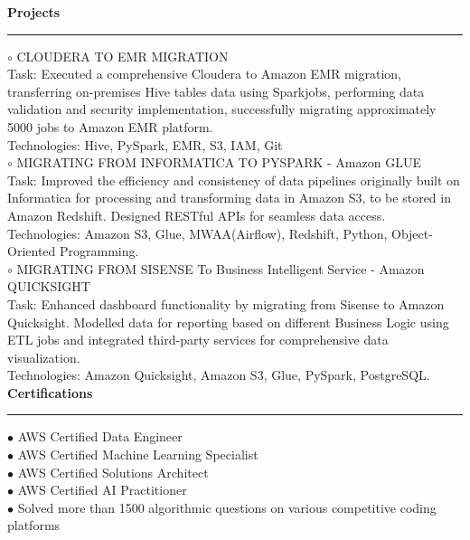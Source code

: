 \documentclass[11pt,a4paper]{article}
\renewcommand{\section}[1]{%
  \vspace{12pt}%
  {\large\bfseries #1}%
  \vspace{6pt}%
  \hrule%
  \vspace{6pt}%
}
\begin{document}
\section{Projects}

\hspace{0.5cm}$\circ$ CLOUDERA TO EMR MIGRATION\\[0.1cm]
Task: Executed a comprehensive Cloudera to Amazon EMR migration, transferring on-premises Hive tables data using Sparkjobs, performing data validation and security implementation, successfully migrating approximately 5000 jobs to Amazon EMR platform.\\[0.2cm]
Technologies: Hive, PySpark, EMR, S3, IAM, Git\\[0.2cm]
\hspace{0.5cm}$\circ$ MIGRATING FROM INFORMATICA TO PYSPARK - Amazon GLUE\\[0.1cm]
Task: Improved the efficiency and consistency of data pipelines originally built on Informatica for processing and transforming data in Amazon S3, to be stored in Amazon Redshift. Designed RESTful APIs for seamless data access.\\[0.2cm]
Technologies: Amazon S3, Glue, MWAA(Airflow), Redshift, Python, Object-Oriented Programming.\\[0.2cm]
\hspace{0.5cm}$\circ$ MIGRATING FROM SISENSE To Business Intelligent Service - Amazon QUICKSIGHT\\[0.1cm]
Task: Enhanced dashboard functionality by migrating from Sisense to Amazon Quicksight. Modelled data for reporting based on different Business Logic using ETL jobs and integrated third-party services for comprehensive data visualization.\\[0.2cm]
Technologies: Amazon Quicksight, Amazon S3, Glue, PySpark, PostgreSQL.\\[0.2cm]
\section{Certifications}

\noindent $\bullet$ AWS Certified Data Engineer\\[0.2cm]
\noindent $\bullet$ AWS Certified Machine Learning Specialist\\[0.2cm]
\noindent $\bullet$ AWS Certified Solutions Architect\\[0.2cm]
\noindent $\bullet$ AWS Certified AI Practitioner\\[0.2cm]
\noindent $\bullet$ Solved more than 1500 algorithmic questions on various competitive coding platforms\\[0.2cm]
\end{document}
